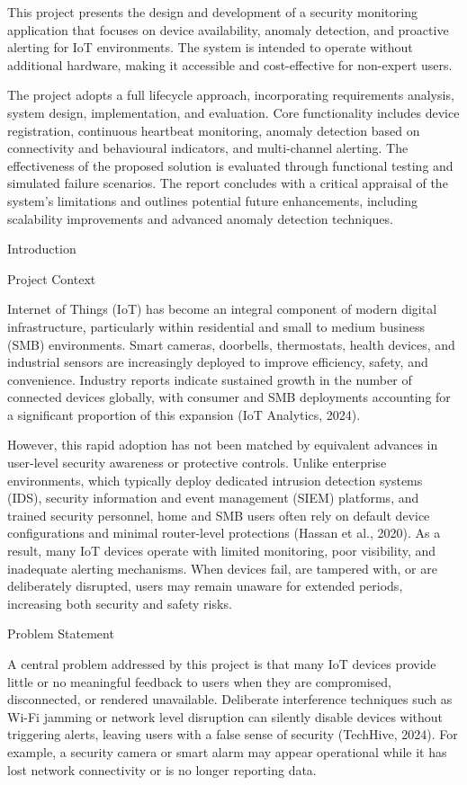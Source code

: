 This project presents the design and development of a security monitoring application that focuses on device availability, anomaly detection, and proactive alerting for IoT environments. The system is intended to operate without additional hardware, making it accessible and cost-effective for non-expert users.

The project adopts a full lifecycle approach, incorporating requirements analysis, system design, implementation, and evaluation. Core functionality includes device registration, continuous heartbeat monitoring, anomaly detection based on connectivity and behavioural indicators, and multi-channel alerting. The effectiveness of the proposed solution is evaluated through functional testing and simulated failure scenarios. The report concludes with a critical appraisal of the system's limitations and outlines potential future enhancements, including scalability improvements and advanced anomaly detection techniques.

Introduction

Project Context

Internet of Things (IoT) has become an integral component of modern digital infrastructure, particularly within residential and small to medium business (SMB) environments. Smart cameras, doorbells, thermostats, health devices, and industrial sensors are increasingly deployed to improve efficiency, safety, and convenience. Industry reports indicate sustained growth in the number of connected devices globally, with consumer and SMB deployments accounting for a significant proportion of this expansion (IoT Analytics, 2024).

However, this rapid adoption has not been matched by equivalent advances in user-level security awareness or protective controls. Unlike enterprise environments, which typically deploy dedicated intrusion detection systems (IDS), security information and event management (SIEM) platforms, and trained security personnel, home and SMB users often rely on default device configurations and minimal router-level protections (Hassan et al., 2020). As a result, many IoT devices operate with limited monitoring, poor visibility, and inadequate alerting mechanisms. When devices fail, are tampered with, or are deliberately disrupted, users may remain unaware for extended periods, increasing both security and safety risks.

Problem Statement

A central problem addressed by this project is that many IoT devices provide little or no meaningful feedback to users when they are compromised, disconnected, or rendered unavailable. Deliberate interference techniques such as Wi-Fi jamming or network level disruption can silently disable devices without triggering alerts, leaving users with a false sense of security (TechHive, 2024). For example, a security camera or smart alarm may appear operational while it has lost network connectivity or is no longer reporting data.

